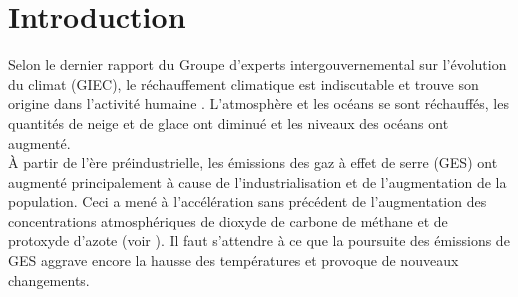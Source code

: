 \chapter{Introduction}
\setlength{\parindent}{0cm}
\setlength{\parskip}{1em}
Selon le dernier rapport du Groupe d'experts intergouvernemental sur l’évolution
du climat (GIEC), le réchauffement climatique est indiscutable et
trouve son origine dans l'activité humaine \citep{IPCC2014}. L’atmosphère et les
océans se sont
réchauffés, les quantités de neige et de glace ont diminué et les niveaux des
océans ont augmenté. \\
À partir de l'ère préindustrielle, les émissions des gaz à effet de serre (GES)
ont augmenté principalement à cause de l'industrialisation et de l'augmentation
de la population. Ceci a mené à l'accélération sans précédent de l'augmentation
des
concentrations atmosphériques de dioxyde de carbone de méthane et de protoxyde
d'azote (voir ).
Il faut s'attendre à ce que la poursuite des émissions de GES aggrave encore la
hausse des températures et provoque de nouveaux changements.
